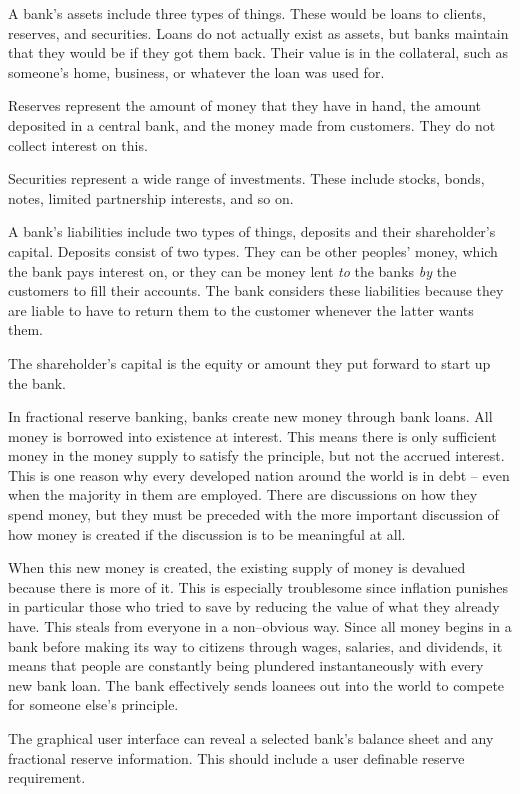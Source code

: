 A bank's assets include three types of things. These would be loans to clients, reserves, and securities. Loans do not actually exist as assets, but banks maintain that they would be if they got them back. Their value is in the collateral, such as someone's home, business, or whatever the loan was used for.

Reserves represent the amount of money that they have in hand, the amount deposited in a central bank, and the money made from customers. They do not collect interest on this. 

Securities represent a wide range of investments. These include stocks, bonds, notes, limited partnership interests, and so on.

A bank's liabilities include two types of things, deposits and their shareholder's capital. Deposits consist of two types. They can be other peoples' money, which the bank pays interest on, or they can be money lent {\it to} the banks {\it by} the customers to fill their accounts. The bank considers these liabilities because they are liable to have to return them to the customer whenever the latter wants them.

The shareholder's capital is the equity or amount they put forward to start up the bank.

In fractional reserve banking, banks create new money through bank loans. All money is borrowed into existence at interest. This means there is only sufficient money in the money supply to satisfy the principle, but not the accrued interest. This is one reason why every developed nation around the world is in debt -- even when the majority in them are employed. There are discussions on how they spend money, but they must be preceded with the more important discussion of how money is created if the discussion is to be meaningful at all.

When this new money is created, the existing supply of money is devalued because there is more of it. This is especially troublesome since inflation punishes in particular those who tried to save by reducing the value of what they already have. This steals from everyone in a non--obvious way. Since all money begins in a bank before making its way to citizens through wages, salaries, and dividends, it means that people are constantly being plundered instantaneously with every new bank loan. The bank effectively sends loanees out into the world to compete for someone else's principle.

The graphical user interface can reveal a selected bank's balance sheet and any fractional reserve information. This should include a user definable reserve requirement.

